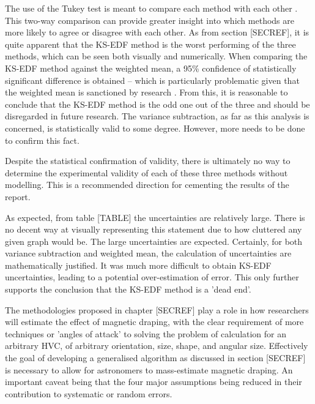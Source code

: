 The use of the Tukey test is meant to compare each method with each other \citep{ID77, ID78}. This two-way comparison can provide greater insight into which methods are more likely to agree or disagree with each other. As from section [SECREF], it is quite apparent that the KS-EDF method is the worst performing of the three methods, which can be seen both visually and numerically. When comparing the KS-EDF method against the weighted mean, a 95\% confidence of statistically significant difference is obtained – which is particularly problematic given that the weighted mean is sanctioned by research \citep{ID5, ID26}. From this, it is reasonable to conclude that the KS-EDF method is the odd one out of the three and should be disregarded in future research. The variance subtraction, as far as this analysis is concerned, is statistically valid to some degree. However, more needs to be done to confirm this fact.


Despite the statistical confirmation of validity, there is ultimately no way to determine the experimental validity of each of these three methods without modelling. This is a recommended direction for cementing the results of the report.


As expected, from table [TABLE] the uncertainties are relatively large. There is no decent way at visually representing this statement due to how cluttered any given graph would be. The large uncertainties are expected. Certainly, for both variance subtraction and weighted mean, the calculation of uncertainties are mathematically justified. It was much more difficult to obtain KS-EDF uncertainties, leading to a potential over-estimation of error. This only further supports the conclusion that the KS-EDF method is a 'dead end'.

The methodologies proposed in chapter [SECREF] play a role in how researchers will estimate the effect of magnetic draping, with the clear requirement of more techniques or 'angles of attack' to solving the problem of calculation for an arbitrary HVC, of arbitrary orientation, size, shape, and angular size. Effectively the goal of developing a generalised algorithm as discussed in section [SECREF] is necessary to allow for astronomers to mass-estimate magnetic draping. An important caveat being that the four major assumptions being reduced in their contribution to systematic or random errors.

